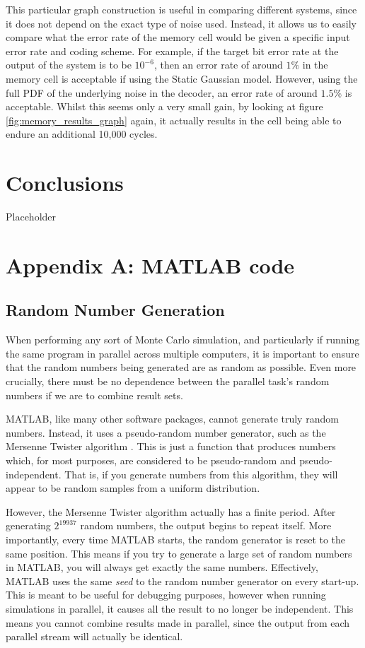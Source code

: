 \documentclass[11pt]{article}
\numberwithin{equation}{subsection}
\begin{document}
This particular graph construction is useful in comparing different systems, since it does not depend on the exact type of noise used. Instead, it allows us to easily compare what the error rate of the memory cell would be given a specific input error rate and coding scheme. For example, if the target bit error rate at the output of the system is to be $10^{-6}$, then an error rate of around $1\%$ in the memory cell is acceptable if using the Static Gaussian model. However, using the full PDF of the underlying noise in the decoder, an error rate of around $1.5\%$ is acceptable. Whilst this seems only a very small gain, by looking at figure \ref{fig:memory_results_graph} again, it actually results in the cell being able to endure an additional 10,000 cycles.

\section{Conclusions}
Placeholder

{}
\section*{Appendix A: MATLAB code}
\subsection*{Random Number Generation}
When performing any sort of Monte Carlo simulation, and particularly if running the same program in parallel across multiple computers, it is important to ensure that the random numbers being generated are as random as possible. Even more crucially, there must be no dependence between the parallel task's random numbers if we are to combine result sets.

MATLAB, like many other software packages, cannot generate truly random numbers. Instead, it uses a pseudo-random number generator, such as the Mersenne Twister algorithm \cite{matlab-rng}. This is just a function that produces numbers which, for most purposes, are considered to be pseudo-random and pseudo-independent. That is, if you generate numbers from this algorithm, they will appear to be random samples from a uniform distribution. 

However, the Mersenne Twister algorithm actually has a finite period. After generating $2^{19937}$ random numbers, the output begins to repeat itself. More importantly, every time MATLAB starts, the random generator is reset to the same position. This means if you try to generate a large set of random numbers in MATLAB, you will always get exactly the same numbers. Effectively, MATLAB uses the same \textit{seed} to the random number generator on every start-up. This is meant to be useful for debugging purposes, however when running simulations in parallel, it causes all the result to no longer be independent. This means you cannot combine results made in parallel, since the output from each parallel stream will actually be identical.
\end{document}

